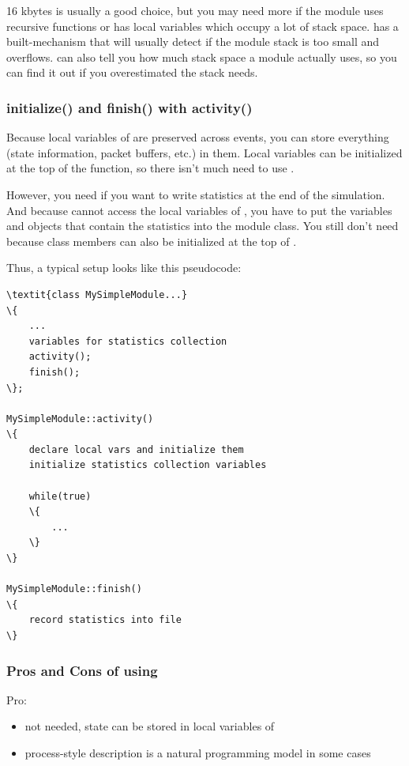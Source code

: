 16 kbytes is usually a good choice, but you may need more if the
module uses recursive functions or has local variables which occupy a
lot of stack space. {\opp} has a built-mechanism that will usually
detect if the module stack is too small and
overflows. {\opp} can also tell you how much
stack space a module actually uses, so you can find
it out if you overestimated the stack needs.


\subsubsection{initialize() and finish() with activity()}


Because local variables of  are preserved across
events, you can store everything (state information, packet buffers,
etc.) in them. Local variables can be initialized at the top of the
 function, so there isn't much need to use
.


However, you need  if you want to write statistics at
the end of the simulation. And because  cannot access
the local variables of , you have to put the variables
and objects that contain the statistics into the module class.
You still don't need  because class members can also
be initialized at the top of .


Thus, a typical setup looks like this pseudocode:


\begin{Verbatim}[commandchars=\\\{\}]
\textit{class MySimpleModule...}
\{
    ...
    variables for statistics collection
    activity();
    finish();
\};

MySimpleModule::activity()
\{
    declare local vars and initialize them
    initialize statistics collection variables

    while(true)
    \{
        ...
    \}
\}

MySimpleModule::finish()
\{
    record statistics into file
\}
\end{Verbatim}


\subsubsection{Pros and Cons of using }


Pro:
\begin{itemize}
   \item{ not needed, state can be stored in local
       variables of }
   \item{process-style description is a natural programming model in some cases}
\end{itemize}

